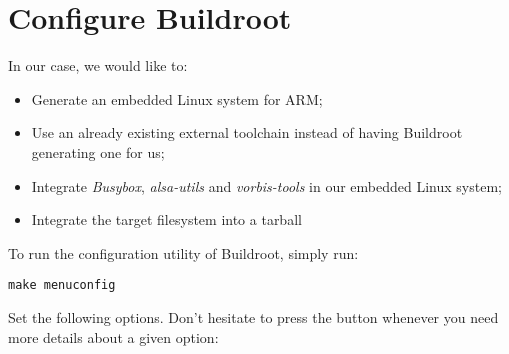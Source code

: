 \section{Configure Buildroot}

In our case, we would like to:

\begin{itemize}
\item Generate an embedded Linux system for ARM;
\item Use an already existing external toolchain instead of having
  Buildroot generating one for us;
\item Integrate {\em Busybox}, {\em alsa-utils} and {\em vorbis-tools}
  in our embedded Linux system;
\item Integrate the target filesystem into a tarball
\end{itemize}

To run the configuration utility of Buildroot, simply run:

\begin{verbatim}
make menuconfig
\end{verbatim}

Set the following options. Don't hesitate to press the 
button whenever you need more details about a given option:

